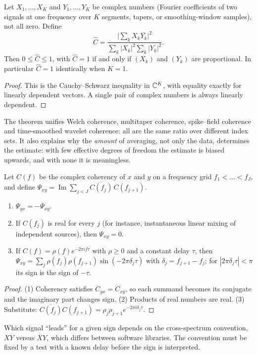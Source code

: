 \begin{theorem}\label{ars:spec-003}
Let $X_1,\dots,X_K$ and $Y_1,\dots,Y_K$ be complex numbers (Fourier coefficients of two signals at one frequency over $K$ segments, tapers, or smoothing-window samples), not all zero. Define
\[\hat C=\frac{\bigl|\sum_kX_k\overline{Y_k}\bigr|^2}{\sum_k|X_k|^2\sum_k|Y_k|^2}.\]
Then $0\le\hat C\le1$, with $\hat C=1$ if and only if $(X_k)$ and $(Y_k)$ are proportional. In particular $\hat C=1$ identically when $K=1$.
\end{theorem}
\begin{proof}
This is the Cauchy--Schwarz inequality in $\mathbb C^K$, with equality exactly for linearly dependent vectors. A single pair of complex numbers is always linearly dependent.
\end{proof}
\begin{remark}
The theorem unifies Welch coherence, multitaper coherence, spike--field coherence and time-smoothed wavelet coherence: all are the same ratio over different index sets. It also explains why the \emph{amount} of averaging, not only the data, determines the estimate: with few effective degrees of freedom the estimate is biased upwards, and with none it is meaningless.
\end{remark}

\begin{theorem}\label{ars:spec-004}
Let $C(f)$ be the complex coherency of $x$ and $y$ on a frequency grid $f_1<\dots<f_J$, and define $\Psi_{xy}=\operatorname{Im}\sum_{j<J}\overline{C(f_j)}\,C(f_{j+1})$.
\begin{enumerate}[leftmargin=2em]
\item $\Psi_{yx}=-\Psi_{xy}$.
\item If $C(f_j)$ is real for every $j$ (for instance, instantaneous linear mixing of independent sources), then $\Psi_{xy}=0$.
\item If $C(f)=\rho(f)e^{-2\pi if\tau}$ with $\rho\ge0$ and a constant delay $\tau$, then $\Psi_{xy}=\sum_j\rho(f_j)\rho(f_{j+1})\sin(-2\pi\delta_j\tau)$ with $\delta_j=f_{j+1}-f_j$; for $|2\pi\delta_j\tau|<\pi$ its sign is the sign of $-\tau$.
\end{enumerate}
\end{theorem}
\begin{proof}
(1) Coherency satisfies $C_{yx}=\overline{C_{xy}}$, so each summand becomes its conjugate and the imaginary part changes sign. (2) Products of real numbers are real. (3) Substitute: $\overline{C(f_j)}C(f_{j+1})=\rho_j\rho_{j+1}e^{-2\pi i\delta_j\tau}$.
\end{proof}
\begin{remark}
Which signal ``leads'' for a given sign depends on the cross-spectrum convention, $X\overline Y$ versus $\overline XY$, which differs between software libraries. The convention must be fixed by a test with a known delay before the sign is interpreted.
\end{remark}

